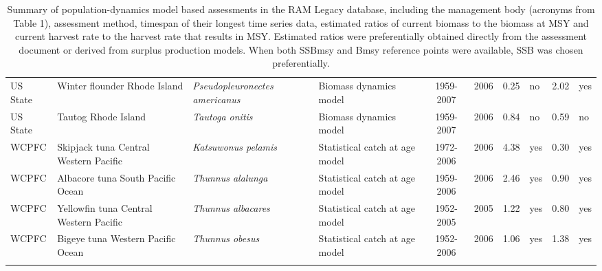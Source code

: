 \begin{longtable}{p{1.8cm}p{3.5cm}p{3.5cm}p{3cm}cccp{0.9cm}cp{0.9cm}}
  US State & Winter flounder Rhode Island & \textit{Pseudopleuronectes americanus} & Biomass dynamics model & 1959-2007 & 2006 & 0.25 & no & 2.02 & yes \\ 
  US State & Tautog Rhode Island & \textit{Tautoga onitis} & Biomass dynamics model & 1959-2007 & 2006 & 0.84 & no & 0.59 & no \\ 
  WCPFC & Skipjack tuna Central Western Pacific & \textit{Katsuwonus pelamis} & Statistical catch at age model & 1972-2006 & 2006 & 4.38 & yes & 0.30 & yes \\ 
  WCPFC & Albacore tuna South Pacific Ocean & \textit{Thunnus alalunga} & Statistical catch at age model & 1959-2006 & 2006 & 2.46 & yes & 0.90 & yes \\ 
  WCPFC & Yellowfin tuna Central Western Pacific & \textit{Thunnus albacares} & Statistical catch at age model & 1952-2005 & 2005 & 1.22 & yes & 0.80 & yes \\ 
  WCPFC & Bigeye tuna Western Pacific Ocean & \textit{Thunnus obesus} & Statistical catch at age model & 1952-2006 & 2006 & 1.06 & yes & 1.38 & yes \\ 
   \hline
\hline
\caption{Summary of population-dynamics model based assessments in the RAM Legacy database, including the management body (acronyms from Table 1), assessment method, timespan of their longest time series data, estimated ratios of current biomass to the biomass at MSY and current harvest rate to the harvest rate that results in MSY. Estimated ratios were preferentially obtained directly from the assessment document or derived from surplus production models. When both SSBmsy and Bmsy reference points were available, SSB was chosen preferentially.}
\label{tab:crosshair}
\end{longtable}
